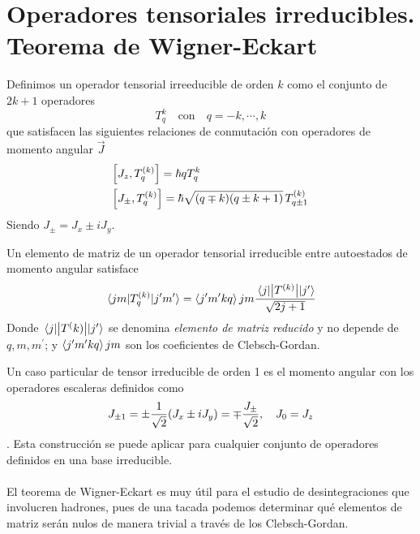 \pagestyle{fancy}
\chapter{Operadores tensoriales irreducibles. Teorema de Wigner-Eckart} \label{chap: Apendice E}
Definimos un operador tensorial irreeducible de orden $k$ como el conjunto de $2k+1$ operadores $$T_q^k \quad \text{con} \quad q=-k,\cdots,k$$ 
que satisfacen las siguientes relaciones de conmutación con operadores de momento angular $\Vec{J}$
\begin{equation}
    \begin{aligned}
        &\qty[J_z,T_q^{(k)}]=\hbar q T_q^{k}\\
        & \qty[J_\pm,T_q^{(k)}]=\hbar \sqrt{(q\mp k)(q\pm k+1)} \, T_{q\pm 1}^{(k)}
    \end{aligned}
\end{equation}
Siendo $J_\pm=J_x \pm i J_y$.

\begin{tcolorbox}[colback=amber!20, colframe=amber, title={Teorema de Wigner-Eckart}]
Un elemento de matriz de un operador tensorial irreducible entre autoestados de momento angular satisface
\begin{equation}
    \mel{jm}{T_q^{(k)}}{j^\prime m^\prime}=\braket{j^\prime m^\prime k q}{j m} \frac{\mel{j}{\abs{T^{(k)}}}{j^\prime}}{\sqrt{2j+1}}
\end{equation}
Donde $\mel{j}{\abs{T^(k)}}{j^\prime}$ se denomina \textit{elemento de matriz reducido} y no depende de $q,m,m^\prime$; y $\braket{j^\prime m^\prime k q}{j m}$ son los coeficientes de Clebsch-Gordan.
\end{tcolorbox}

Un caso particular de tensor irreducible de orden 1 es el momento angular con los operadores escaleras definidos como $$J_{\pm 1}=\pm\frac{1}{\sqrt{2}}\qty(J_x\pm iJ_y)=\mp \frac{J_\pm}{\sqrt{2}}, \quad J_0=J_z $$.
Esta construcción se puede aplicar para cualquier conjunto de operadores definidos en una base irreducible.\\\\
El teorema de Wigner-Eckart es muy útil para el estudio de desintegraciones que involucren hadrones, pues de una tacada podemos determinar qué elementos de matriz serán nulos de manera trivial a través de los Clebsch-Gordan.